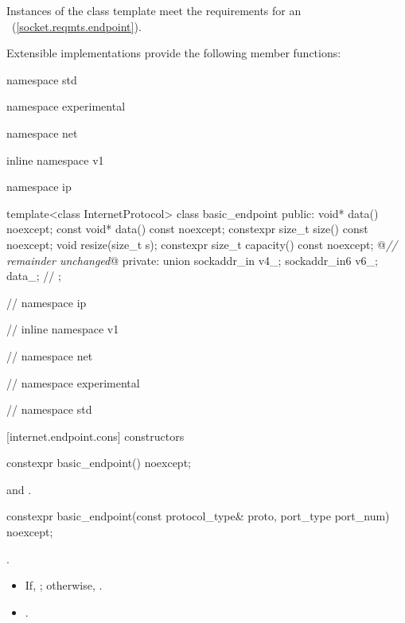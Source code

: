 \pnum
Instances of the  class template meet the requirements for an ~(\ref{socket.reqmts.endpoint}).

\pnum
 Extensible implementations provide the following member functions:

\begin{codeblock}
namespace std {
namespace experimental {
namespace net {
inline namespace v1 {
namespace ip {

  template<class InternetProtocol>
  class basic_endpoint
  {
  public:
    void* data() noexcept;
    const void* data() const noexcept;
    constexpr size_t size() const noexcept;
    void resize(size_t s);
    constexpr size_t capacity() const noexcept;
    @\textit{// remainder unchanged}@
  private:
    union
    {
      sockaddr_in v4_;
      sockaddr_in6 v6_;
    } data_; // \expos
  };

} // namespace ip
} // inline namespace v1
} // namespace net
} // namespace experimental
} // namespace std
\end{codeblock}


[internet.endpoint.cons]{ constructors}

\begin{itemdecl}
constexpr basic_endpoint() noexcept;
\end{itemdecl}

\begin{itemdescr}
\pnum
\postconditions {} and .
\end{itemdescr}

\begin{itemdecl}
constexpr basic_endpoint(const protocol_type& proto,
                         port_type port_num) noexcept;
\end{itemdecl}

\begin{itemdescr}
\pnum
\requires {}.

\pnum
\postconditions 
\begin{itemize}
\item
 If, ; otherwise, .
\item
{}.
\end{itemize}
\end{itemdescr}

